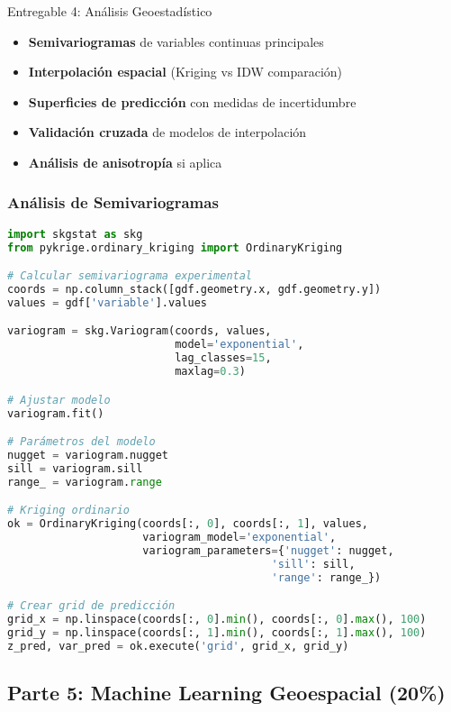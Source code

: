 \documentclass[12pt,a4paper]{article}
\begin{document}
\begin{deliverable}{Entregable 4: Análisis Geoestadístico}
\begin{itemize}
    \item \textbf{Semivariogramas} de variables continuas principales
    \item \textbf{Interpolación espacial} (Kriging vs IDW comparación)
    \item \textbf{Superficies de predicción} con medidas de incertidumbre
    \item \textbf{Validación cruzada} de modelos de interpolación
    \item \textbf{Análisis de anisotropía} si aplica
\end{itemize}
\end{deliverable}

\subsubsection{Análisis de Semivariogramas}

\begin{lstlisting}[language=Python]
import skgstat as skg
from pykrige.ordinary_kriging import OrdinaryKriging

# Calcular semivariograma experimental
coords = np.column_stack([gdf.geometry.x, gdf.geometry.y])
values = gdf['variable'].values

variogram = skg.Variogram(coords, values,
                          model='exponential',
                          lag_classes=15,
                          maxlag=0.3)

# Ajustar modelo
variogram.fit()

# Parámetros del modelo
nugget = variogram.nugget
sill = variogram.sill
range_ = variogram.range

# Kriging ordinario
ok = OrdinaryKriging(coords[:, 0], coords[:, 1], values,
                     variogram_model='exponential',
                     variogram_parameters={'nugget': nugget,
                                         'sill': sill,
                                         'range': range_})

# Crear grid de predicción
grid_x = np.linspace(coords[:, 0].min(), coords[:, 0].max(), 100)
grid_y = np.linspace(coords[:, 1].min(), coords[:, 1].max(), 100)
z_pred, var_pred = ok.execute('grid', grid_x, grid_y)
\end{lstlisting}

\subsection{Parte 5: Machine Learning Geoespacial (20\%)}
\end{document}
